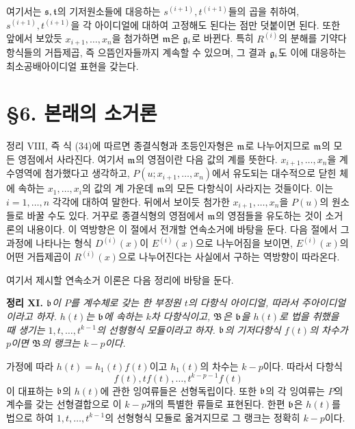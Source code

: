 여기서는 \(\mathfrak s,\mathfrak t\)의 기저원소들에 대응하는 \(s^{(i+1)},t^{(i+1)}\)들의 곱을 취하여, \(s^{(i+1)},t^{(i+1)}\)을 각 아이디얼에 대하여 고정해도 된다는 점만 덧붙이면 된다. 또한 앞에서 보았듯 \(x_{i+1},\ldots,x_n\)을 첨가하면 \(\mathfrak m\)은 \(\mathfrak g_i\)로 바뀐다. 특히 \(R^{(i)}\)의 분해를 기약다항식들의 거듭제곱, 즉 으뜸인자들까지 계속할 수 있으며, 그 결과 \(\mathfrak g_i\)도 이에 대응하는 최소공배아이디얼 표현을 갖는다.

\section*{\S{}6. 본래의 소거론}

정리 VIII, 즉 식 (34)에 따르면 종결식형과 초등인자형은 \(\mathfrak m\)로 나누어지므로 \(\mathfrak m\)의 모든 영점에서 사라진다. 여기서 \glqq{}\(\mathfrak m\)의 영점\grqq{}이란 다음 값의 계를 뜻한다. \(x_{i+1},\ldots,x_n\)을 계수영역에 첨가했다고 생각하고, \(P(u;x_{i+1},\ldots,x_n)\)에서 유도되는 대수적으로 닫힌 체에 속하는 \(x_1,\ldots,x_i\)의 값의 계 가운데 \(\mathfrak m\)의 모든 다항식이 사라지는 것들이다. 이는 \(i=1,\ldots,n\) 각각에 대하여 말한다. 뒤에서 보이듯 첨가한 \(x_{i+1},\ldots,x_n\)을 \(P(u)\)의 원소들로 바꿀 수도 있다. 거꾸로 종결식형의 영점에서 \(\mathfrak m\)의 영점들을 유도하는 것이 소거론의 내용이다. 이 역방향은 이 절에서 전개할 연속소거에 바탕을 둔다. 다음 절에서 그 과정에 나타나는 형식 \(D^{(i)}(x)\)이 \(E^{(i)}(x)\)으로 나누어짐을 보이면, \(E^{(i)}(x)\)의 어떤 거듭제곱이 \(R^{(i)}(x)\)으로 나누어진다는 사실에서 구하는 역방향이 따라온다.

여기서 제시할 연속소거 이론은 다음 정리에 바탕을 둔다.

\medskip
\noindent\textbf{정리 XI.} \emph{\(\mathfrak b\)이 \(P\)를 계수체로 갖는 한 부정원 \(t\)의 다항식 아이디얼, 따라서 주아이디얼이라고 하자. \(h(t)\)는 \(\mathfrak b\)에 속하는 \(k\)차 다항식이고, \(\mathfrak B\)은 \(\mathfrak b\)을 \(h(t)\)로 법을 취했을 때 생기는 \(1,t,\ldots,t^{k-1}\)의 선형형식 모듈이라고 하자. \(\mathfrak b\)의 기저다항식 \(f(t)\)의 차수가 \(p\)이면 \(\mathfrak B\)의 랭크는 \(k-p\)이다.}

가정에 따라 \(h(t)=h_1(t)f(t)\)이고 \(h_1(t)\)의 차수는 \(k-p\)이다. 따라서 다항식
\[
f(t),tf(t),\ldots,t^{k-p-1}f(t)
\]
이 대표하는 \(\mathfrak b\)의 \(h(t)\)에 관한 잉여류들은 선형독립이다. 또한 \(\mathfrak b\)의 각 잉여류는 \(P\)의 계수를 갖는 선형결합으로 이 \(k-p\)개의 특별한 류들로 표현된다. 한편 \(\mathfrak b\)은 \(h(t)\)를 법으로 하여 \(1,t,\ldots,t^{k-1}\)의 선형형식 모듈로 옮겨지므로 그 랭크는 정확히 \(k-p\)이다.


